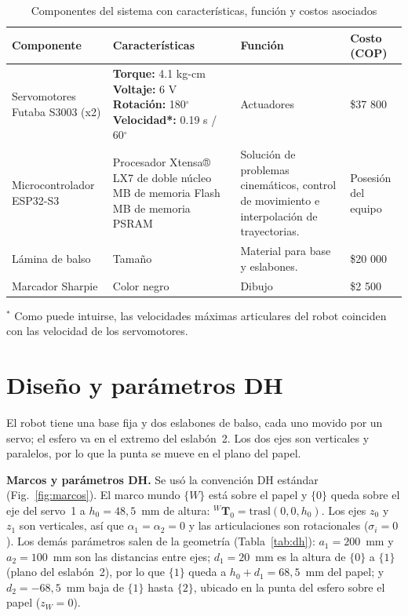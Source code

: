 \documentclass[10pt, letterpaper]{article}
\begin{document}
\begin{table}[H]
    \centering
    \caption{Componentes del sistema con características, función y costos asociados}
    \label{tab:compos}
    \begin{minipage}{15.2cm} %
        \centering
        \begin{tabular}{|p{3.2cm}|p{4.5cm}|p{4.5cm}|p{2.2cm}|}
        \hline
        \textbf{Componente} & \textbf{Características} & \textbf{Función} & \textbf{Costo (COP)} \\ \hline
        Servomotores Futaba S3003 (x2) & \textbf{Torque:} 4.1 kg-cm \newline \textbf{Voltaje:} 6 V \newline \textbf{Rotación:} 180$^\circ$ \newline \textbf{Velocidad*:} 0.19 s / 60$^\circ$ & Actuadores & \$37 800 \\ \hline
        Microcontrolador ESP32-S3 & Procesador Xtensa® LX7 de doble núcleo \newline 16 MB de memoria Flash \newline 8 MB de memoria PSRAM & Solución de problemas cinemáticos, control de movimiento e interpolación de trayectorias. & Posesión del equipo \\ \hline
        Lámina de balso & Tamaño & Material para base y eslabones. & \$20 000 \\ \hline
        Marcador Sharpie & Color negro & Dibujo & \$2 500 \\ \hline
        \end{tabular}
        
        \vspace{1.5mm} %
        \raggedright \footnotesize $^*$ Como puede intuirse, las velocidades máximas articulares del robot coinciden con las velocidad de los servomotores.
    \end{minipage}
\end{table}
\section{Dise\~no y par\'ametros DH}
\label{sec:disenio}
El robot tiene una base fija y dos eslabones de balso, cada uno movido por un servo; el esfero va en el extremo del eslab\'on~2. Los dos ejes son verticales y paralelos, por lo que la punta se mueve en el plano del papel.
 
\textbf{Marcos y par\'ametros DH.} Se us\'o la convenci\'on DH est\'andar (Fig.~\ref{fig:marcos}). El marco mundo $\{W\}$ est\'a sobre el papel y $\{0\}$ queda sobre el eje del servo~1 a $h_0=48{,}5$~mm de altura: ${}^{W}\mathbf{T}_{0}=\mathrm{trasl}(0,0,h_0)$. Los ejes $z_0$ y $z_1$ son verticales, as\'i que $\alpha_1=\alpha_2=0$ y las articulaciones son rotacionales ($\sigma_i=0$). Los dem\'as par\'ametros salen de la geometr\'ia (Tabla~\ref{tab:dh}):
$a_1=200$~mm y $a_2=100$~mm son las distancias entre ejes; $d_1=20$~mm es la altura de $\{0\}$ a $\{1\}$ (plano del eslab\'on~2), por lo que $\{1\}$ queda a $h_0+d_1=68{,}5$~mm del papel; y $d_2=-68{,}5$~mm baja de $\{1\}$ hasta $\{2\}$, ubicado en la punta del esfero sobre el papel ($z_W=0$).
 
\end{document}
